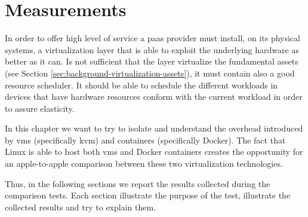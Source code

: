 %
%
\chapter{Measurements}
\label{cap:measurements}
In order to offer high level of service a \ac{paas} provider must install, on its physical systems,
a virtualization layer that is able to exploit the underlying hardware as better as it can. Is not
sufficient that the layer virtualize the fundamental assets (see Section
\ref{sec:background-virtualization-assets}), it must contain also a good resource scheduler. It should
be able to schedule the different workloads in devices that have hardware resources conform with the
current workload in order to assure elasticity.

In this chapter we want to try to isolate and understand the overhead introduced by \ac{vm}s
(specifically \ac{kvm}) and containers (specifically Docker). The fact that Linux is able to host
both \ac{vm}s and Docker containers creates the opportunity for an apple-to-apple comparison between
these two virtualization technologies.

Thus, in the following sections we report the results collected during the comparison tests. Each 
section illustrate the purpose of the test, illustrate the collected results and try to explain them.









